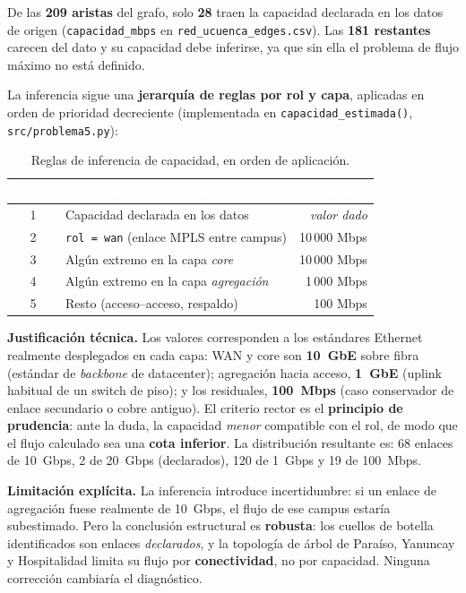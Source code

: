\documentclass[11pt, a4paper]{article}
\newcommand{\encabezado}[1]{%
    \cellcolor{tabhead}\textcolor{white}{\textbf{#1}}}
\newcommand{\code}[1]{\texttt{\small #1}}
\begin{document}
De las \textbf{209 aristas} del grafo, solo \textbf{28} traen la capacidad
declarada en los datos de origen (\code{capacidad\_mbps} en
\code{red\_ucuenca\_edges.csv}). Las \textbf{181 restantes} carecen del
dato y su capacidad debe inferirse, ya que sin ella el problema de flujo
máximo no está definido.

La inferencia sigue una \textbf{jerarquía de reglas por rol y capa},
aplicadas en orden de prioridad decreciente (implementada en
\code{capacidad\_estimada()}, \code{src/problema5.py}):

\begin{table}[htbp]
\centering
\caption{Reglas de inferencia de capacidad, en orden de aplicación.}
\label{tab:inferencia_cap}
\small
\begin{tabular}{c L{6.4cm} r}
    \toprule
    \encabezado{Orden} & \encabezado{Condición sobre la arista} &
    \encabezado{Capacidad} \\
    \midrule
    1 & Capacidad declarada en los datos & \textit{valor dado} \\
    2 & \code{rol = wan} (enlace MPLS entre campus) & 10\,000 Mbps \\
    3 & Algún extremo en la capa \textit{core} & 10\,000 Mbps \\
    4 & Algún extremo en la capa \textit{agregación} & 1\,000 Mbps \\
    5 & Resto (acceso--acceso, respaldo) & 100 Mbps \\
    \bottomrule
\end{tabular}
\end{table}

\textbf{Justificación técnica.} Los valores corresponden a los estándares
Ethernet realmente desplegados en cada capa: WAN y core son \textbf{10~GbE}
sobre fibra (estándar de \textit{backbone} de datacenter); agregación hacia
acceso, \textbf{1~GbE} (uplink habitual de un switch de piso); y los
residuales, \textbf{100~Mbps} (caso conservador de enlace secundario o
cobre antiguo). El criterio rector es el \textbf{principio de prudencia}:
ante la duda, la capacidad \textit{menor} compatible con el rol, de modo que
el flujo calculado sea una \textbf{cota inferior}. La distribución
resultante es: 68 enlaces de 10~Gbps, 2 de 20~Gbps (declarados), 120 de
1~Gbps y 19 de 100~Mbps.

\textbf{Limitación explícita.} La inferencia introduce incertidumbre: si un
enlace de agregación fuese realmente de 10~Gbps, el flujo de ese campus
estaría subestimado. Pero la conclusión estructural es \textbf{robusta}:
los cuellos de botella identificados son enlaces \textit{declarados}, y la
topología de árbol de Paraíso, Yanuncay y Hospitalidad limita su flujo por
\textbf{conectividad}, no por capacidad. Ninguna corrección cambiaría el
diagnóstico.
\end{document}
